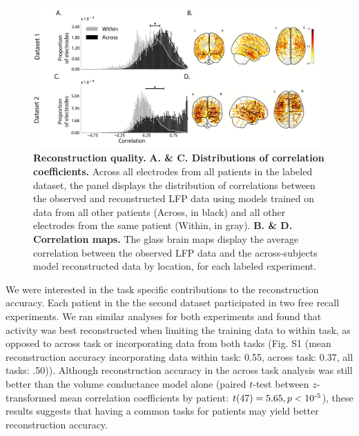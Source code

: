 \documentclass[11pt]{article}
\begin{document}
\begin{figure}
  \centering
  \includegraphics[width=\textwidth]{figs/corrmap}
  \caption{\textbf{Reconstruction quality.}  \textbf{A. \& C.  Distributions
      of correlation coefficients.}  Across all electrodes from all
    patients in the labeled dataset, the panel displays the distribution of correlations between the observed and reconstructed LFP data using models trained on data from all other patients (Across, in black) and all other electrodes from the same patient (Within, in gray). 
    \textbf{B. \& D. Correlation maps.}  The glass brain maps display the
    average correlation between the observed LFP data and the across-subjects model reconstructed data by location, for each labeled experiment.}
  \label{fig:corrmap}
\end{figure}

We were interested in the task specific contributions to the reconstruction accuracy.  Each patient in the the second dataset participated in two free recall experiments.  We ran similar analyses for both experiments and found that activity was best reconstructed when limiting the training data to within task, as opposed to across task or incorporating data from both tasks (Fig. S1 (mean reconstruction accuracy incorporating data within task: 0.55, across task: 0.37, all tasks: .50)). Although reconstruction accuracy in the across task analysis was still better than the volume conductance model alone (paired $t$-test
between $z$-transformed mean correlation coefficients by patient: $t(47) = 5.65, p < 10\textsuperscript{-5}$), these results suggests that having a common tasks for patients may yield better reconstruction accuracy.  
\end{document}
